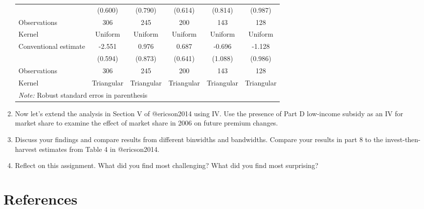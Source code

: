 \documentclass[
  12pt,
]{article}
\begin{document}
\begin{enumerate}
\begin{table}
\begin{tabular}[t]{lccccc}
  \hspace{1em} & (0.600) & (0.790) & (0.614) & (0.814) & (0.987)\\
  \hspace{1em}Observations & 306 & 245 & 200 & 143 & \vphantom{1} 128\\
  \hspace{1em}Kernel & Uniform & Uniform & Uniform & Uniform & Uniform\\
  \hspace{1em}Conventional estimate & -2.551 & 0.976 & 0.687 & -0.696 & -1.128\\
  \hspace{1em} & (0.594) & (0.873) & (0.641) & (1.088) & (0.986)\\
  \hspace{1em}Observations & 306 & 245 & 200 & 143 & 128\\
  \hspace{1em}Kernel & Triangular & Triangular & Triangular & Triangular & Triangular\\
  \bottomrule
  \bottomrule
  \multicolumn{6}{l}{\textit{Note:} Robust standard erros in parenthesis}\\
      \end{tabular}
      \end{table}
\item
  Now let's extend the analysis in Section V of @ericson2014 using IV.
  Use the presence of Part D low-income subsidy as an IV for market
  share to examine the effect of market share in 2006 on future premium
  changes.
\item
  Discuss your findings and compare results from different binwidths and
  bandwidths. Compare your results in part 8 to the invest-then-harvest
  estimates from Table 4 in @ericson2014.
\item
  Reflect on this assignment. What did you find most challenging? What
  did you find most surprising?
\end{enumerate}

\hypertarget{references}{%
\section{References}\label{references}}
\end{document}
